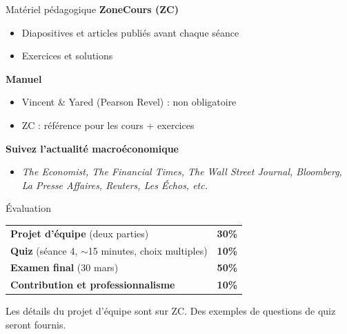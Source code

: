 \documentclass[aspectratio=169]{beamer}
\begin{document}
\begin{frame}{Mat\'eriel p\'edagogique}
   \textbf{ZoneCours (ZC)}
   \vspace{0.1cm}
   \begin{itemize}
      \setlength\itemsep{0.1cm}
      \item Diapositives et articles publi\'es avant chaque s\'eance
      \item Exercices et solutions
   \end{itemize}
   \vspace{0.3cm}
   \textbf{Manuel}
   \vspace{0.1cm}
   \begin{itemize}
      \setlength\itemsep{0.1cm}
      \item Vincent \& Yared (Pearson Revel) : non obligatoire
      \item ZC : r\'ef\'erence pour les cours + exercices
   \end{itemize}
   \vspace{0.3cm}
   \textbf{Suivez l'actualit\'e macro\'economique}
   \vspace{0.1cm}
   \begin{itemize}
      \item \textit{The Economist, The Financial Times, The Wall Street Journal, Bloomberg, La Presse Affaires, Reuters, Les \'Echos, etc.}
   \end{itemize}
\end{frame}

\begin{frame}{\'Evaluation}
   \vspace{0.3cm}
   \begin{tabular}{l r}
      \textbf{Projet d'\'equipe} (deux parties) & \textbf{30\%} \\[0.2cm]
      \textbf{Quiz} (s\'eance 4, $\sim$15 minutes, choix multiples) & \textbf{10\%} \\[0.2cm]
      \textbf{Examen final} (30 mars) & \textbf{50\%} \\[0.2cm]
      \textbf{Contribution et professionnalisme} & \textbf{10\%} \\
   \end{tabular}
   \vspace{0.4cm}
   \begin{defbox}[D\'etails]
      Les d\'etails du projet d'\'equipe sont sur ZC. Des exemples de questions de quiz seront fournis.
   \end{defbox}
\end{frame}
\end{document}
